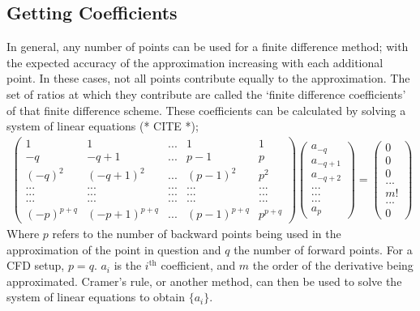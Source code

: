 \subsection{Getting Coefficients}
In general, any number of points can be used for a finite difference method; with the expected accuracy of the approximation increasing with each additional point. In these cases, not all points contribute equally to the approximation. The set of ratios at which they contribute are called the `finite difference coefficients' of that finite difference scheme. These coefficients can be calculated by solving a system of linear equations (* CITE *);
\begin{align*}
\begin{pmatrix}
1&1&...&1&1\\
-q&-q+1&...&p-1&p\\
(-q)^{2}&(-q+1)^{2}&...&(p-1)^{2}&p^{2}\\
...&...&...&...&...\\
...&...&...&...&...\\
...&...&...&...&...\\
(-p)^{p+q}&(-p+1)^{p+q}&...&(p-1)^{p+q}&p^{p+q}
\end{pmatrix}{\begin{pmatrix}
a_{-q}\\
a_{-q+1}\\
a_{-q+2}\\
...\\
...\\
...\\
a_{p}
\end{pmatrix}} = {\begin{pmatrix}
0\\
0\\
0\\
...\\
m!\\
...\\
0
\end{pmatrix}}
\end{align*}
Where $p$ refers to the number of backward points being used in the approximation of the point in question and $q$ the number of forward points. For a CFD setup, $p=q$. 
$a_{i}$ is the $i^{\text{th}}$ coefficient, and $m$ the order of the derivative being approximated. Cramer's rule, or another method, can then be used to solve the system of linear equations to obtain $\{a_{i}\}$.

